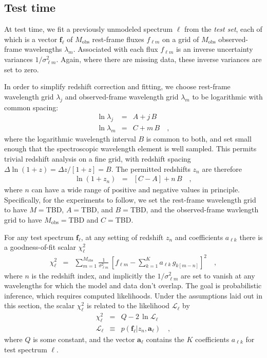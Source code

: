 \documentclass[preprint]{aastex}
\newcommand{\mmatrix}[1]{\boldsymbol{#1}}
\newcommand{\avec}{\mmatrix{a}}
\newcommand{\fvec}{\mmatrix{f}}
\newcommand{\obs}{\mathrm{obs}}
\newcommand{\like}{\mathscr{L}}
\begin{document}
\subsection{Test time}

At test time, we fit a previously unmodeled spectrum $\ell$ from the
\emph{test set}, each of which is a vector $\fvec_\ell$ of $M_\obs$
rest-frame fluxes $f_{\ell m}$ on a grid of $M_\obs$ observed-frame
wavelengths $\lambda_m$.  Associated with each flux $f_{\ell m}$ is an
inverse uncertainty variances $1/\sigma^2_{\ell m}$.  Again, where
there are missing data, these inverse variances are set to zero.

In order to simplify redshift correction and fitting, we choose
rest-frame wavelength grid $\lambda_j$ and observed-frame wavelength
grid $\lambda_m$ to be logarithmic with common spacing:
\begin{eqnarray}\displaystyle
\ln\lambda_j &=& A + j\,B \nonumber\\
\ln\lambda_m &=& C + m\,B
\quad ,
\end{eqnarray}
where the logarithmic wavelength interval $B$ is common to both, and
set small enough that the spectroscopic wavelength element is well
sampled.  This permits trivial redshift analysis on a fine grid, with
redshift spacing $\Delta\ln(1+z)=\Delta z/[1+z]=B$.  The permitted
redshifts $z_n$ are therefore
\begin{eqnarray}\displaystyle
\ln(1+z_n) &=& [C - A] + n\,B
\quad ,
\end{eqnarray}
where $n$ can have a wide range of positive and negative values in
principle.  Specifically, for the experiments to follow, we set the
rest-frame wavelength grid to have $M=$TBD, $A=$TBD, and $B=$TBD, and
the observed-frame wavlength grid to have $M_\obs=$TBD and $C=$TBD.

For any test spectrum $\fvec_\ell$, at any setting of redshift $z_n$
and coefficients $a_{\ell k}$ there is a goodness-of-fit scalar
$\chi^2_\ell$
\begin{eqnarray}\displaystyle
\chi^2_\ell &=& \sum_{m=1}^{M_\obs} \frac{1}{\sigma^2_{\ell m}}
 \,\left[f_{\ell m} - \sum_{k=1}^K a_{\ell k}\,g_{k[m-n]}\right]^2
\quad,
\end{eqnarray}
where $n$ is the redshift index, and implicitly the $1/\sigma^2_{\ell
  m}$ are set to vanish at any wavelengths for which the model and
data don't overlap.  The goal is probabilistic inference, which
requires computed likelihoods.  Under the assumptions laid out in this
section, the scalar $\chi^2_\ell$ is related to the likelihood
$\like_\ell$ by
\begin{eqnarray}\displaystyle
\chi^2_\ell &=& Q - 2\,\ln\like_\ell \nonumber\\
\like_\ell &\equiv& p(\fvec_\ell|z_n,\avec_\ell)
\quad ,
\end{eqnarray}
where $Q$ is some constant, and the vector $\avec_\ell$ contains the
$K$ coefficients $a_{\ell k}$ for test spectrum $\ell$.
\end{document}

